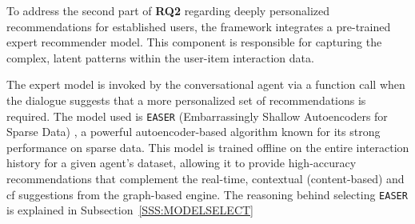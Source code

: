 To address the second part of \textbf{RQ2} regarding deeply personalized recommendations for established users, the framework integrates a pre-trained expert recommender model. This component is responsible for capturing the complex, latent patterns within the user-item interaction data.

The expert model is invoked by the conversational agent via a function call when the dialogue suggests that a more personalized set of recommendations is required. The model used is \texttt{EASER} (Embarrassingly Shallow Autoencoders for Sparse Data) \cite{EASER}, a powerful autoencoder-based algorithm known for its strong performance on sparse data. This model is trained offline on the entire interaction history for a given agent's dataset, allowing it to provide high-accuracy recommendations that complement the real-time, contextual (content-based) and \acl{cf} suggestions from the graph-based engine. The reasoning behind selecting \texttt{EASER} is explained in Subsection~\ref{SSS:MODELSELECT}